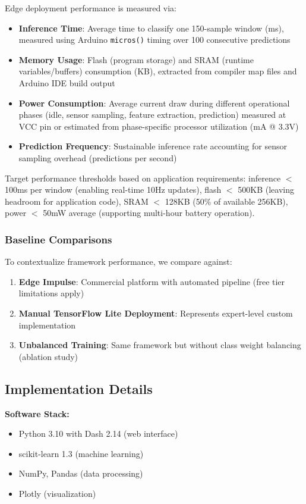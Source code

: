 Edge deployment performance is measured via:
\begin{itemize}
    \item \textbf{Inference Time}: Average time to classify one 150-sample window (ms), measured using Arduino \texttt{micros()} timing over 100 consecutive predictions
    \item \textbf{Memory Usage}: Flash (program storage) and SRAM (runtime variables/buffers) consumption (KB), extracted from compiler map files and Arduino IDE build output
    \item \textbf{Power Consumption}: Average current draw during different operational phases (idle, sensor sampling, feature extraction, prediction) measured at VCC pin or estimated from phase-specific processor utilization (mA @ 3.3V)
    \item \textbf{Prediction Frequency}: Sustainable inference rate accounting for sensor sampling overhead (predictions per second)
\end{itemize}
Target performance thresholds based on application requirements: inference $<$ 100ms per window (enabling real-time 10Hz updates), flash $<$ 500KB (leaving headroom for application code), SRAM $<$ 128KB (50\% of available 256KB), power $<$ 50mW average (supporting multi-hour battery operation).

\subsubsection{Baseline Comparisons}
To contextualize framework performance, we compare against:
\begin{enumerate}
    \item \textbf{Edge Impulse}: Commercial platform with automated pipeline (free tier limitations apply)
    \item \textbf{Manual TensorFlow Lite Deployment}: Represents expert-level custom implementation
    \item \textbf{Unbalanced Training}: Same framework but without class weight balancing (ablation study)
\end{enumerate}

\subsection{Implementation Details}
\textbf{Software Stack:}
\begin{itemize}
    \item Python 3.10 with Dash 2.14 (web interface)
    \item scikit-learn 1.3 (machine learning)
    \item NumPy, Pandas (data processing)
    \item Plotly (visualization)
\end{itemize}

